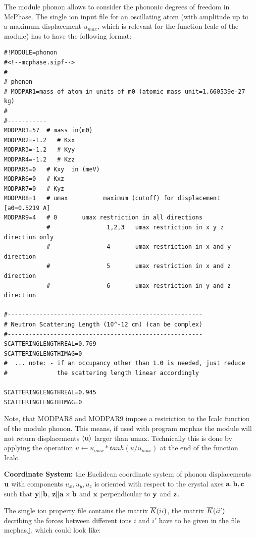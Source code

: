 The module {\prg phonon} allows to consider the phononic degrees of freedom in {\prg McPhase}.
The single ion input file for an oscillating atom (with amplitude 
up to a maximum displacement $u_{max}$, which is relevant for the function {\prg Icalc} of the
module) has to have the following format:

\begin{verbatim}
#!MODULE=phonon
#<!--mcphase.sipf-->
#
# phonon
# MODPAR1=mass of atom in units of m0 (atomic mass unit=1.660539e-27 kg)
#
#-----------
MODPAR1=57  # mass in(m0)
MODPAR2=-1.2   # Kxx
MODPAR3=-1.2   # Kyy
MODPAR4=-1.2   # Kzz
MODPAR5=0   # Kxy  in (meV)
MODPAR6=0   # Kxz
MODPAR7=0   # Kyz
MODPAR8=1   # umax          maximum (cutoff) for displacement [a0=0.5219 A]
MODPAR9=4   # 0       umax restriction in all directions
            #                1,2,3   umax restriction in x y z direction only
            #                4       umax restriction in x and y direction
            #                5       umax restriction in x and z direction
            #                6       umax restriction in y and z direction

#-------------------------------------------------------
# Neutron Scattering Length (10^-12 cm) (can be complex)
#-------------------------------------------------------
SCATTERINGLENGTHREAL=0.769
SCATTERINGLENGTHIMAG=0
#  ... note: - if an occupancy other than 1.0 is needed, just reduce 
#              the scattering length linear accordingly

SCATTERINGLENGTHREAL=0.945
SCATTERINGLENGTHIMAG=0
\end{verbatim}

Note, that {\prg MODPAR8} and {\prg MODPAR9} impose a restriction to the {\prg Icalc} function
of the module {\prg phonon}. This means, if used with program {\prg mcphas} the
module will not return displacements $\langle \mathbf u \rangle$ larger than umax.
Technically this is done by applying the operation $u \leftarrow u_{max} * tanh (u/u_{max})$
at the end of the function {\prg Icalc}. 

{\bf Coordinate System:} the Euclidean coordinate system of phonon displacements $\mathbf u$ with
components $u_x,u_y,u_z$ is oriented with respect to the crystal axes $\mathbf a,\mathbf b, \mathbf c$
such that $\mathbf y || \mathbf b$, $\mathbf z || \mathbf a \times \mathbf b $ and $\mathbf x$ perpendicular
to $\mathbf y$ and $\mathbf z$.

The single ion property file contains the matrix $\overline{K}(ii)$, the matrix $\overline{K}(ii')$ decribing the
forces between
different ions $i$ and $i'$ have to be given in the file {\prg mcphas.j}, which could
look like:

